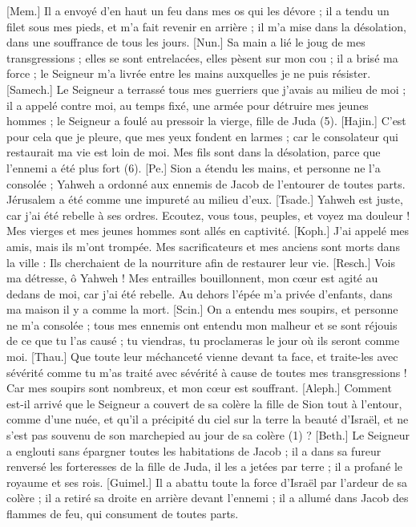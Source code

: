 \begin{multicols}{2}
[Mem.] Il a envoyé d'en haut un feu dans mes os qui les dévore ; il a tendu un filet sous mes pieds, et m'a fait revenir en arrière ; il m'a mise dans la désolation, dans une souffrance de tous les jours.
[Nun.] Sa main a lié le joug de mes transgressions ; elles se sont entrelacées, elles pèsent sur mon cou ;  il a brisé ma force ; le Seigneur m’a livrée entre les mains auxquelles je ne puis résister.
[Samech.] Le Seigneur a terrassé tous mes guerriers que j'avais au milieu de moi ; il a appelé contre moi, au temps fixé, une armée pour détruire mes jeunes hommes ; le Seigneur a foulé au pressoir la vierge, fille de Juda (5).
[Hajin.] C’est pour cela que je pleure, que mes yeux fondent en larmes ; car le consolateur qui restaurait ma vie est loin de moi.  Mes fils sont dans la désolation, parce que l'ennemi a été plus fort (6).
[Pe.] Sion a étendu les mains, et personne ne l'a consolée ; Yahweh a ordonné aux ennemis de Jacob de l’entourer de toutes parts. Jérusalem a été comme une impureté au milieu d'eux.
[Tsade.] Yahweh est juste, car j'ai été rebelle à ses ordres. Ecoutez, vous tous, peuples, et voyez ma douleur ! Mes vierges et mes jeunes hommes sont allés en captivité.
[Koph.] J'ai appelé mes amis, mais ils m'ont trompée. Mes sacrificateurs et mes anciens sont morts dans la ville : Ils cherchaient de la nourriture afin de restaurer leur vie.
[Resch.] Vois ma détresse, ô Yahweh ! Mes entrailles bouillonnent, mon cœur est agité au dedans de moi, car j'ai été rebelle. Au dehors l’épée m’a privée d’enfants, dans ma maison il y a comme la mort.
[Scin.] On a entendu mes soupirs, et personne ne m'a consolée ; tous mes ennemis ont entendu mon malheur et se sont réjouis de ce que tu l’as causé ; tu viendras, tu proclameras le jour où ils seront comme moi.
[Thau.] Que toute leur méchanceté vienne devant ta face, et traite-les avec sévérité  comme tu m'as traité avec sévérité à cause de toutes mes transgressions ! Car mes soupirs sont nombreux, et mon cœur est souffrant.
\VerseOne{}[Aleph.] Comment est-il arrivé que le Seigneur a couvert  de sa colère la fille de Sion tout à l’entour, comme d’une nuée, et qu’il a précipité du ciel sur la terre la beauté d’Israël, et ne s’est pas souvenu de son marchepied au jour de sa colère (1) ?
[Beth.] Le Seigneur a englouti sans épargner toutes les habitations de Jacob ; il a dans sa fureur renversé les forteresses de la fille de Juda, il les a jetées par terre ; il a profané le royaume et ses rois.
[Guimel.] Il a abattu toute la force d’Israël par l’ardeur de sa colère ; il a retiré sa droite en arrière devant l’ennemi ; il a allumé dans Jacob des flammes de feu, qui consument de toutes parts.

\end{multicols}
